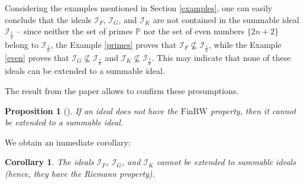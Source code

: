 \documentclass{amsart}
\newtheorem{prop}[thm]{Proposition}
\newtheorem{cor}[thm]{Corollary}
\theoremstyle{definition}
\theoremstyle{definition}
\newcommand{\I}{\mathcal I}
\newcommand{\finbw}{\text{FinBW}}
\begin{document}

Considering the examples mentioned in Section \ref{examples}, one can easily conclude that the ideals $\I_F$, $\I_G$, and $\I_K$ are not contained in the summable ideal $\I_{\frac{1}{n}}$ -- since neither the set of primes $\mathbb{P}$ nor the set of even numbers $\{2n+2\}$ belong to $\I_{\frac{1}{n}}$, the Example \ref{primes} proves that $\I_F \not\subseteq \I_{\frac{1}{n}}$, while the Example \ref{even} proves that $\I_G \not\subseteq \I_{\frac{1}{n}}$ and $\I_K \not\subseteq \I_{\frac{1}{n}}$.
This may indicate that none of these ideals can be extended to a summable ideal.

The result from the paper \cite{H3} allows to confirm these presumptions.
\begin{prop}[{\cite[Corollary 3.5]{H3}}]
If an ideal does not have the $\finbw$ property, then it cannot be extended to a summable ideal.
\end{prop}

We obtain an immediate corollary:
\begin{cor}
The ideals $\I_F$, $\I_G$, and $\I_K$ cannot be extended to summable ideals (hence, they have the Riemann property).
\end{cor}











\end{document}
